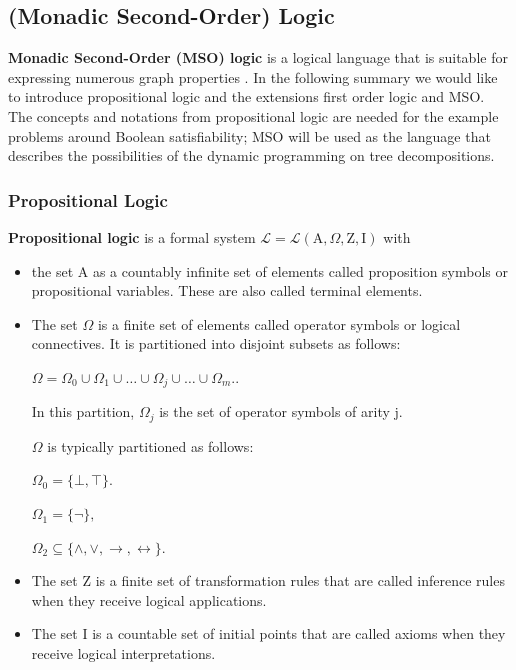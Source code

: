 \documentclass[a4paper, 12pt, bibliography=totoc]{scrartcl}
\begin{document}
\subsection{(Monadic Second-Order) Logic}\label{sec:MSO}

\textbf{Monadic Second-Order (MSO) logic} is a logical language that is suitable for expressing numerous graph properties \cite[p.~41]{Courcelle2012}. In the following summary we would like to introduce propositional logic and the extensions first order logic and MSO. The concepts and notations from propositional logic are needed for the example problems around Boolean satisfiability; MSO will be used as the language that describes the possibilities of the dynamic programming on tree decompositions.

\subsubsection{Propositional Logic}
\textbf{Propositional logic} is a formal system $\mathcal{L} = \mathcal{L}(\mathrm {A},\Omega, \mathrm{Z}, \mathrm{I})$ with
\begin{itemize}
	\item the set $\mathrm {A}$ as a countably infinite set of elements called proposition symbols or propositional variables. These are also called terminal elements.
	\item The set $\Omega$ is a finite set of elements called operator symbols or logical connectives. It is partitioned into disjoint subsets as follows:
	
	$\Omega =\Omega _{0}\cup \Omega _{1}\cup \ldots \cup \Omega _{j}\cup \ldots \cup \Omega _{m}.$.
	
	In this partition, $\Omega _{j}$ is the set of operator symbols of arity j.
	
	$\Omega$ is typically partitioned as follows:
	
	${ \Omega _{0}=\{\bot ,\top \}.}$ 
	
	${\Omega _{1}=\{\lnot \},}$
	
	${ \Omega _{2}\subseteq \{\land ,\lor ,\to ,\leftrightarrow \}.}$

	\item The set $\mathrm {Z}$ is a finite set of transformation rules that are called inference rules when they receive logical applications.
	
	\item The set $\mathrm {I}$ is a countable set of initial points that are called axioms when they receive logical interpretations.
\end{itemize}
\end{document}
